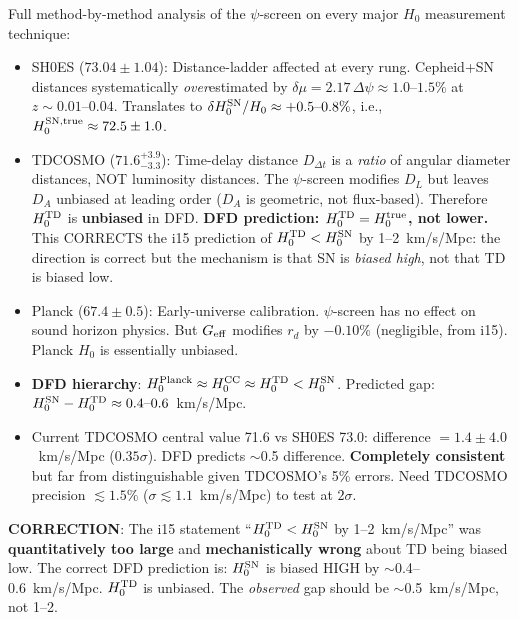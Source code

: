 \documentclass[11pt,a4paper]{article}
\newcommand{\Dpsi}{\Delta\psi}
\begin{document}
\begin{tcolorbox}[colback=yellow!5!white, colframe=red!70!black,
  title=\textbf{W4i17 TOP 5 FINDINGS --- RANKED BY IMPACT}]
\begin{enumerate}
  Full method-by-method analysis of the $\psi$-screen on every major
  $H_0$ measurement technique:
  \begin{itemize}[nosep]
  \item SH0ES ($73.04 \pm 1.04$): Distance-ladder affected at every rung.
    Cepheid+SN distances systematically \emph{over}estimated by
    $\delta\mu = 2.17\,\Dpsi \approx 1.0\text{--}1.5\%$ at $z \sim 0.01$--$0.04$.
    Translates to $\delta H_0^{\rm SN}/H_0 \approx +0.5\text{--}0.8\%$,
    i.e., $H_0^{\rm SN,true} \approx 72.5 \pm 1.0$.
  \item TDCOSMO ($71.6^{+3.9}_{-3.3}$): Time-delay distance $D_{\Delta t}$
    is a \emph{ratio} of angular diameter distances, NOT luminosity
    distances. The $\psi$-screen modifies $D_L$ but leaves $D_A$ unbiased
    at leading order ($D_A$ is geometric, not flux-based). Therefore
    $H_0^{\rm TD}$ is \textbf{unbiased} in DFD.
    \textbf{DFD prediction: $H_0^{\rm TD} = H_0^{\rm true}$, not lower.}
    This CORRECTS the i15 prediction of $H_0^{\rm TD} < H_0^{\rm SN}$
    by 1--2~km/s/Mpc: the direction is correct but the mechanism is
    that SN is \emph{biased high}, not that TD is biased low.
  \item Planck ($67.4 \pm 0.5$): Early-universe calibration. $\psi$-screen
    has no effect on sound horizon physics. But $G_{\rm eff}$ modifies
    $r_d$ by $-0.10\%$ (negligible, from i15). Planck $H_0$ is essentially
    unbiased.
  \item \textbf{DFD hierarchy}: $H_0^{\rm Planck} \approx H_0^{\rm CC}
    \approx H_0^{\rm TD} < H_0^{\rm SN}$.
    Predicted gap: $H_0^{\rm SN} - H_0^{\rm TD} \approx 0.4\text{--}0.6$~km/s/Mpc.
  \item Current TDCOSMO central value 71.6 vs SH0ES 73.0:
    difference $= 1.4 \pm 4.0$~km/s/Mpc ($0.35\sigma$).
    DFD predicts $\sim$0.5 difference. \textbf{Completely consistent}
    but far from distinguishable given TDCOSMO's 5\% errors.
    Need TDCOSMO precision $\lesssim 1.5\%$ ($\sigma \lesssim 1.1$~km/s/Mpc)
    to test at $2\sigma$.
  \end{itemize}

  \textbf{CORRECTION}: The i15 statement ``$H_0^{\rm TD} < H_0^{\rm SN}$
  by 1--2~km/s/Mpc'' was \textbf{quantitatively too large} and
  \textbf{mechanistically wrong} about TD being biased low.
  The correct DFD prediction is: $H_0^{\rm SN}$ is biased HIGH by
  $\sim$0.4--0.6~km/s/Mpc. $H_0^{\rm TD}$ is unbiased. The
  \emph{observed} gap should be $\sim$0.5~km/s/Mpc, not 1--2.


\end{enumerate}
\end{tcolorbox}
\end{document}
